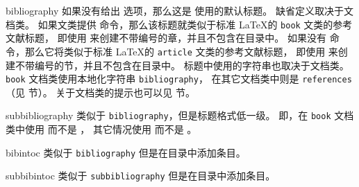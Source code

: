 \begin{valuelist*}

\item[bibliography]
如果没有给出  选项，那么这是  使用的默认标题。
缺省定义取决于文档类。
如果文类提供  命令，那么该标题就类似于标准 \LaTeX 的 \texttt{book} 文类的参考文献标题，
即使用  来创建不带编号的章，并且不包含在目录中。
如果没有  命令，那么它将类似于标准 \LaTeX 的 \texttt{article} 文类的参考文献标题，
即使用  来创建不带编号的节，并且不包含在目录中。
标题中使用的字符串也取决于文档类。
\texttt{book} 文档类使用本地化字符串 \texttt{bibliography}，
在其它文档类中则是 \texttt{references}（见  节）。
关于文档类的提示也可以见  节。

\item[subbibliography]
类似于 \texttt{bibliography}，但是标题格式低一级。
即，在 \texttt{book} 文档类中使用  而不是 ，
其它情况使用  而不是 。

\item[bibintoc]
类似于 \texttt{bibliography} 但是在目录中添加条目。

\item[subbibintoc]
类似于 \texttt{subbibliography} 但是在目录中添加条目。


\end{valuelist*}
